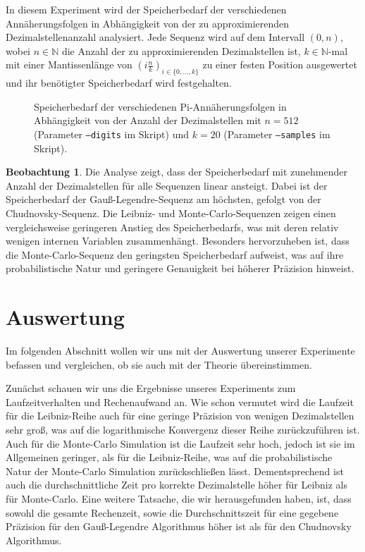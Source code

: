 \documentclass{scrartcl}
\theoremstyle{definition}
\newtheorem{approximation sequence}{Annäherungsfolge}
\newtheorem{observation}{Beobachtung}
\newcommand{\field}[1]{\mathbb{#1}}
\newcommand{\nats}{\field{N}}
\begin{document}
In diesem Experiment wird der Speicherbedarf der verschiedenen
Annäherungsfolgen in Abhängigkeit von der zu approximierenden
Dezimalstellenanzahl analysiert. Jede Sequenz wird auf dem Intervall \((0,
n)\), wobei \(n \in \nats\) die Anzahl der zu approximierenden Dezimalstellen
ist, \(k \in \nats\)-mal mit einer Mantissenlänge von \(\left(i
\frac{n}{k}\right)_{i \in \{0, \ldots, k\}}\) zu einer festen Position
ausgewertet und ihr benötigter Speicherbedarf wird festgehalten.

\begin{figure}[H]
    \centering
    
    \caption{
        Speicherbedarf der verschiedenen Pi-Annäherungsfolgen in Abhängigkeit
        von der Anzahl der Dezimalstellen mit \(n = 512\) (Parameter
        \texttt{--digits} im Skript) und \(k = 20\) (Parameter
        \texttt{--samples} im Skript).
    }
    \label{fig:memory-usage}
\end{figure}

\begin{observation}
    Die Analyse zeigt, dass der Speicherbedarf mit zunehmender Anzahl der
    Dezimalstellen für alle Sequenzen linear ansteigt. Dabei ist der
    Speicherbedarf der Gauß-Legendre-Sequenz am höchsten, gefolgt von der
    Chudnovsky-Sequenz. Die Leibniz- und Monte-Carlo-Sequenzen zeigen einen
    vergleichsweise geringeren Anstieg des Speicherbedarfs, was mit deren
    relativ wenigen internen Variablen zusammenhängt. Besonders hervorzuheben
    ist, dass die Monte-Carlo-Sequenz den geringsten Speicherbedarf aufweist,
    was auf ihre probabilistische Natur und geringere Genauigkeit bei höherer
    Präzision hinweist.
\end{observation}

\section{Auswertung}
Im folgenden Abschnitt wollen wir uns mit der Auswertung unserer Experimente
befassen und vergleichen, ob sie auch mit der Theorie übereinstimmen.

Zunächst schauen wir uns die Ergebnisse unseres Experiments zum
Laufzeitverhalten und Rechenaufwand an. Wie schon vermutet wird die Laufzeit
für die Leibniz-Reihe auch für eine geringe Präzision von wenigen
Dezimalstellen sehr groß, was auf die logarithmische Konvergenz dieser Reihe
zurückzuführen ist. Auch für die Monte-Carlo Simulation ist die Laufzeit sehr
hoch, jedoch ist sie im Allgemeinen geringer, als für die Leibniz-Reihe, was
auf die probabilistische Natur der Monte-Carlo Simulation zurückschließen
lässt. Dementsprechend ist auch die durchschnittliche Zeit pro korrekte
Dezimalstelle höher für Leibniz als für Monte-Carlo. Eine weitere Tatsache, die
wir herausgefunden haben, ist, dass sowohl die gesamte Rechenzeit, sowie die
Durchschnittszeit für eine gegebene Präzision für den Gauß-Legendre Algorithmus
höher ist als für den Chudnovsky Algorithmus.
\end{document}
